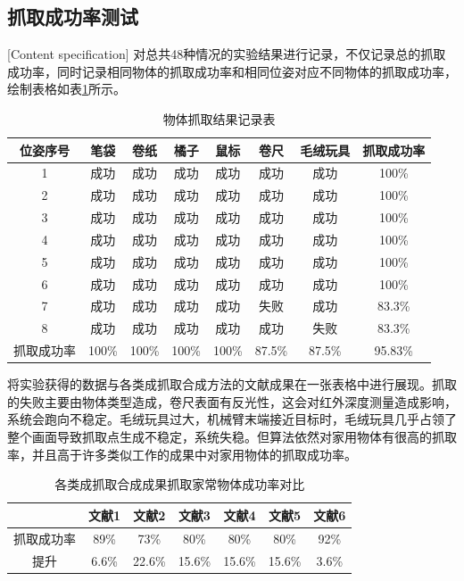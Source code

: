 \documentclass[fontset=fandol,type=bachelor,campus=harbin,bsmainpagenumberline=true]{hithesisbook}
\begin{document}
\subsection{抓取成功率测试}[Content specification]
对总共48种情况的实验结果进行记录，不仅记录总的抓取成功率，同时记录相同物体的抓取成功率和相同位姿对应不同物体的抓取成功率，绘制表格如表\ref{物体抓取结果记录表}所示。
\begin{table}[htbp]
\caption{物体抓取结果记录表}
\label{物体抓取结果记录表}
\vspace{0.5em}\centering\wuhao
\begin{tabular}{cccccccc}
\toprule[1.5pt]
位姿序号 & 笔袋 & 卷纸 & 橘子 & 鼠标 & 卷尺 & 毛绒玩具 & 抓取成功率\\
\midrule[1pt]
 1 & 成功 & 成功 & 成功 & 成功 & 成功 & 成功 & 100\%\\
 2 & 成功 & 成功 & 成功 & 成功 & 成功 & 成功 & 100\%\\
 3 & 成功 & 成功 & 成功 & 成功 & 成功 & 成功 & 100\%\\
 4 & 成功 & 成功 & 成功 & 成功 & 成功 & 成功 & 100\%\\
 5 & 成功 & 成功 & 成功 & 成功 & 成功 & 成功 & 100\%\\
 6 & 成功 & 成功 & 成功 & 成功 & 成功 & 成功 & 100\%\\
 7 & 成功 & 成功 & 成功 & 成功 & 失败 & 成功 & 83.3\%\\
 8 & 成功 & 成功 & 成功 & 成功 & 成功 & 失败 & 83.3\%\\

\bottomrule[1.5pt]
抓取成功率 & 100\% & 100\% & 100\% & 100\% & 87.5\% & 87.5\% & {\color{red}95.83\%}\\
\hline
\end{tabular}
\end{table}


将实验获得的数据与各类成抓取合成方法的文献成果在一张表格中进行展现。抓取的失败主要由物体类型造成，卷尺表面有反光性，这会对红外深度测量造成影响，系统会跑向不稳定。毛绒玩具过大，机械臂末端接近目标时，毛绒玩具几乎占领了整个画面导致抓取点生成不稳定，系统失稳。但算法依然对家用物体有很高的抓取率，并且高于许多类似工作的成果中对家用物体的抓取成功率。
\begin{table}[htbp]
\caption{各类成抓取合成成果抓取家常物体成功率对比}
\label{各类成抓取合成成果抓取家常物体成功率对比}
\vspace{0.5em}\centering\wuhao
\begin{tabular}{ccccccc}
\toprule[1.5pt]
   & 文献1\cite{lenz2015deep} & 文献2\cite{pinto2016supersizing} & 文献3\cite{johns2016deep} & 文献4\cite{mahler2017dex} & 文献5\cite{levine2018learning} & 文献6\cite{haviland2020control}\\
\midrule[1pt]
 抓取成功率 & 89\% & 73\% & 80\% & 80\% & 80\% & 92\% \\
 提升 & 6.6\% & 22.6\% & 15.6\% & 15.6\% & 15.6\% & 3.6\% \\

\bottomrule[1.5pt]
\end{tabular}
\end{table}
\end{document}
